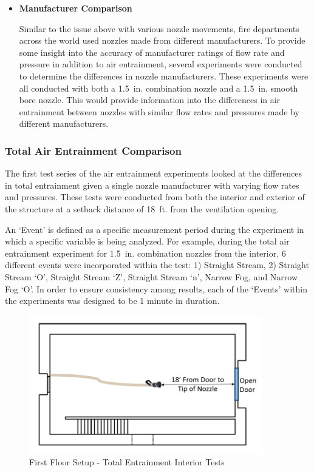 \documentclass{article}
\begin{document}
\begin{itemize}
\vspace*{\baselineskip}

\item \bf{Manufacturer Comparison}
\normalfont
\vspace*{\baselineskip}

Similar to the issue above with various nozzle movements, fire departments across the world used nozzles made from different manufacturers. To provide some insight into the accuracy of manufacturer ratings of flow rate and pressure in addition to air entrainment, several experiments were conducted to determine the differences in nozzle manufacturers. These experiments were all conducted with both a 1.5~in. combination nozzle and a 1.5~in. smooth bore nozzle. This would provide information into the differences in air entrainment between nozzles with similar flow rates and pressures made by different manufacturers.

\vspace*{\baselineskip}

\end{itemize}

\clearpage

\subsubsection{Total Air Entrainment Comparison}

The first test series of the air entrainment experiments looked at the differences in total entrainment given a single nozzle manufacturer with varying flow rates and pressures. These tests were conducted from both the interior and exterior of the structure at a setback distance of 18~ft. from the ventilation opening. 

An `Event' is defined as a specific measurement period during the experiment in which a specific variable is being analyzed. For example, during the total air entrainment experiment for 1.5~in. combination nozzles from the interior, 6 different events were incorporated within the test: 1) Straight Stream, 2) Straight Stream `O', Straight Stream `Z', Straight Stream `n', Narrow Fog, and Narrow Fog `O'. In order to ensure consistency among results, each of the `Events' within the experiments was designed to be 1 minute in duration. 

\begin{figure}[!ht]
	\centering
	\includegraphics[width=4in]{Figures/Air_Entrainment/Measurement_Locations_Firstfloor}
	\caption{First Floor Setup - Total Entrainment Interior Tests}
	\label{fig:First_Floor_Setup_Total_Entrainment_Interior_Tests}
\end{figure}
\end{document}
